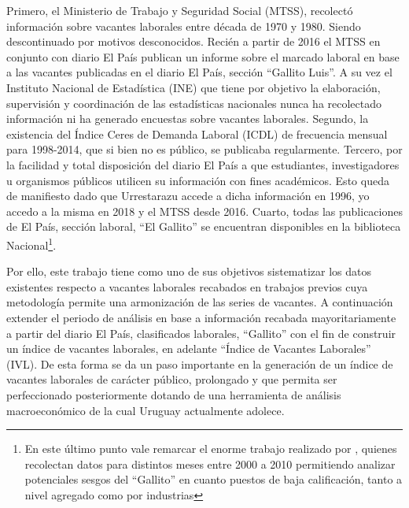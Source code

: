 Primero, el Ministerio de Trabajo y Seguridad Social (MTSS), recolectó información sobre vacantes laborales entre década de 1970 y 1980. Siendo descontinuado por motivos desconocidos. Recién a partir de 2016 el MTSS en conjunto con diario El País publican un informe sobre el marcado laboral en base a las vacantes publicadas en el diario El País, sección ``Gallito Luis''. A su vez el Instituto Nacional de Estadística (INE) que tiene por objetivo la elaboración, supervisión y coordinación de las estadísticas nacionales nunca ha recolectado información ni ha generado encuestas sobre vacantes laborales. Segundo, la existencia del Índice Ceres de Demanda Laboral (ICDL) de frecuencia mensual para 1998-2014, que si bien no es público, se publicaba regularmente. Tercero, por la facilidad y total disposición del diario El País a que estudiantes, investigadores u organismos públicos utilicen su información con fines académicos. Esto queda de manifiesto dado que Urrestarazu accede a dicha información en 1996, yo accedo a la misma en 2018 y el MTSS desde 2016. Cuarto, todas las publicaciones de El País, sección laboral, ``El Gallito'' se encuentran disponibles en la biblioteca Nacional\footnote{En este último punto vale remarcar el enorme trabajo realizado por \cite{Alma2011}, quienes recolectan datos para distintos meses entre 2000 a 2010 permitiendo analizar potenciales sesgos del ``Gallito'' en cuanto puestos de baja calificación, tanto a nivel agregado como por industrias}.


Por ello, este trabajo tiene como uno de sus objetivos sistematizar los datos existentes respecto a vacantes laborales recabados en trabajos previos cuya metodología permite una armonización de las series de vacantes. A continuación extender el periodo de análisis en base a información recabada mayoritariamente a partir del diario El País, clasificados laborales, ``Gallito'' con el fin de construir un índice de vacantes laborales, en adelante ``Índice de Vacantes Laborales'' (IVL). De esta forma se da un paso importante en la generación de un índice de vacantes laborales de carácter público, prolongado y que permita ser perfeccionado posteriormente dotando de una herramienta de análisis macroeconómico de la cual Uruguay actualmente adolece.


